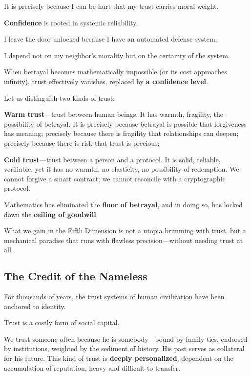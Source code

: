 It is precisely because I can be hurt that my trust carries moral weight.

\vspace{1em}

\textbf{Confidence} is rooted in systemic reliability.

I leave the door unlocked because I have an automated defense system.

I depend not on my neighbor's morality but on the certainty of the system.

When betrayal becomes mathematically impossible (or its cost approaches infinity), trust effectively vanishes, replaced by \textbf{a confidence level}.

\vspace{1em}

Let us distinguish two kinds of trust:

\textbf{Warm trust}---trust between human beings. It has warmth, fragility, the possibility of betrayal. It is precisely because betrayal is possible that forgiveness has meaning; precisely because there is fragility that relationships can deepen; precisely because there is risk that trust is precious;

\textbf{Cold trust}---trust between a person and a protocol. It is solid, reliable, verifiable, yet it has no warmth, no elasticity, no possibility of redemption. We cannot forgive a smart contract; we cannot reconcile with a cryptographic protocol.

\begin{importantbox}
Mathematics has eliminated the \textbf{floor of betrayal}, and in doing so, has locked down the \textbf{ceiling of goodwill}.
\end{importantbox}

What we gain in the Fifth Dimension is not a utopia brimming with trust, but a mechanical paradise that runs with flawless precision---without needing trust at all.

\newpage
\subsection{The Credit of the Nameless}
For thousands of years, the trust systems of human civilization have been anchored to identity.

\vspace{1em}

Trust is a costly form of social capital.

We trust someone often because he is somebody---bound by family ties, endorsed by institutions, weighted by the sediment of history. His past serves as collateral for his future.
This kind of trust is \textbf{deeply personalized}, dependent on the accumulation of reputation, heavy and difficult to transfer.

